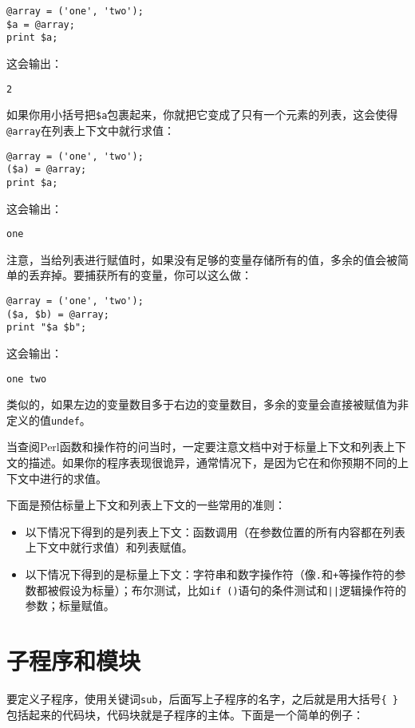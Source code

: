 \begin{lstlisting}
@array = ('one', 'two');
$a = @array;
print $a;
\end{lstlisting}

这会输出：

\begin{lstlisting}
2
\end{lstlisting}

如果你用小括号把\verb|$a|包裹起来，你就把它变成了只有一个元素的列表，这会使得\verb|@array|在列表上下文中就行求值：

\begin{lstlisting}
@array = ('one', 'two');
($a) = @array;
print $a;
\end{lstlisting}

这会输出：

\begin{lstlisting}
one
\end{lstlisting}

注意，当给列表进行赋值时，如果没有足够的变量存储所有的值，多余的值会被简单的丢弃掉。要捕获所有的变量，你可以这么做：

\begin{lstlisting}
@array = ('one', 'two');
($a, $b) = @array;
print "$a $b";
\end{lstlisting}

这会输出：

\begin{lstlisting}
one two
\end{lstlisting}

类似的，如果左边的变量数目多于右边的变量数目，多余的变量会直接被赋值为非定义的值\verb|undef|。

当查阅Perl函数和操作符的问当时，一定要注意文档中对于标量上下文和列表上下文的描述。如果你的程序表现很诡异，通常情况下，是因为它在和你预期不同的上下文中进行的求值。

下面是预估标量上下文和列表上下文的一些常用的准则：

\begin{itemize}
  \item 以下情况下得到的是列表上下文：函数调用（在参数位置的所有内容都在列表上下文中就行求值）和列表赋值。
  \item 以下情况下得到的是标量上下文：字符串和数字操作符（像\verb|.|和\verb|+|等操作符的参数都被假设为标量）；布尔测试，比如\verb|if ()|语句的条件测试和\verb=||=逻辑操作符的参数；标量赋值。
\end{itemize}

\section{子程序和模块}
要定义子程序，使用关键词\verb|sub|，后面写上子程序的名字，之后就是用大括号\verb|{ }|包括起来的代码块，代码块就是子程序的主体。下面是一个简单的例子：

